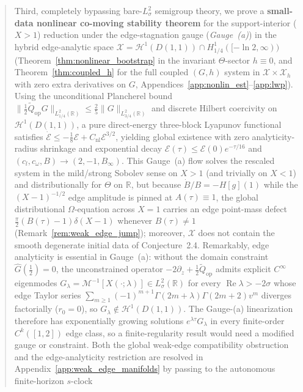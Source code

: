 \documentclass[11pt,a4paper]{article}
\begin{document}
\begin{abstract}
Third, completely bypassing bare-$L^2_\sigma$ semigroup theory, we prove a \textbf{small-data
nonlinear co-moving stability theorem} for the support-interior ($X>1$) reduction under the
edge-stagnation gauge (\emph{Gauge~(a)}) in the hybrid edge-analytic space
$\mathcal{X}=\mathcal{H}^1(D(1,1))\cap H^1_{1/4}([-\ln 2,\infty))$
(Theorem~\ref{thm:nonlinear_bootstrap} in the invariant $\Theta$-sector $h\equiv 0$, and
Theorem~\ref{thm:coupled_h} for the full coupled $(G,h)$ system in $\mathcal{X}\times\mathcal{X}_h$
with zero extra derivatives on $G$, Appendices~\ref{app:nonlin_est}--\ref{app:lwp}).
Using the unconditional Plancherel bound $\|\tfrac12\widetilde{Q}_{\mathrm{op}}G\|_{L^2_{1/4}(\mathbb{R})}\le\frac{2}{5}\|G\|_{L^2_{3/4}(\mathbb{R})}$
and discrete Hilbert coercivity on $\mathcal{H}^1(D(1,1))$, a pure direct-energy three-block
Lyapunov functional satisfies $\dot{\mathcal{E}}\le -\frac{1}{8}\mathcal{E}+C_{\mathrm{nl}}\mathcal{E}^{3/2}$,
yielding global existence with zero analyticity-radius shrinkage and exponential decay
$\mathcal{E}(\tau)\le\mathcal{E}(0)e^{-\tau/16}$ and $(c_l,c_\omega,B)\to(2,-1,B_\infty)$.
This Gauge~(a) flow solves the rescaled system in the mild/strong Sobolev sense on $X>1$ (and trivially
on $X<1$) and distributionally for $\Theta$ on $\mathbb{R}$, but because $\dot B/B=-H[g](1)$ while the
$(X-1)^{-1/2}$ edge amplitude is pinned at $A(\tau)\equiv 1$, the global distributional
$\Omega$-equation across $X=1$ carries an edge point-mass defect
$\tfrac{\pi}{2}(B(\tau)-1)\delta(X-1)$ whenever $B(\tau)\ne 1$ (Remark~\ref{rem:weak_edge_jump});
moreover, $\mathcal{X}$ does not contain the smooth degenerate initial data of Conjecture~2.4.  Remarkably, edge analyticity is essential in Gauge~(a): without the domain
constraint $\widehat{G}(\tfrac12)=0$, the unconstrained operator $-2\partial_z+\tfrac12\widetilde{Q}_{\mathrm{op}}$
admits explicit $C^\infty$ eigenmodes $G_\lambda=\mathcal{M}^{-1}[X(\cdot;\lambda)]\in L^2_\sigma(\mathbb{R})$
for every $\operatorname{Re}\lambda>-2\sigma$ whose edge Taylor series
$\sum_{m\ge 1}(-1)^{m+1}\Gamma(2m+\lambda)\Gamma(2m+2)v^m$ diverges factorially ($r_0=0$), so
$G_\lambda\notin\mathcal{H}^1(D(1,1))$.  The Gauge-(a) linearization therefore has exponentially
growing solutions $e^{\lambda\tau}G_\lambda$ in every finite-order $C^k([1,2])$ edge class, so a
finite-regularity result would need a modified gauge or constraint.
Both the global weak-edge compatibility obstruction and the edge-analyticity restriction are resolved
in Appendix~\ref{app:weak_edge_manifolds} by passing to the autonomous finite-horizon $s$-clock

\end{abstract}
\end{document}
